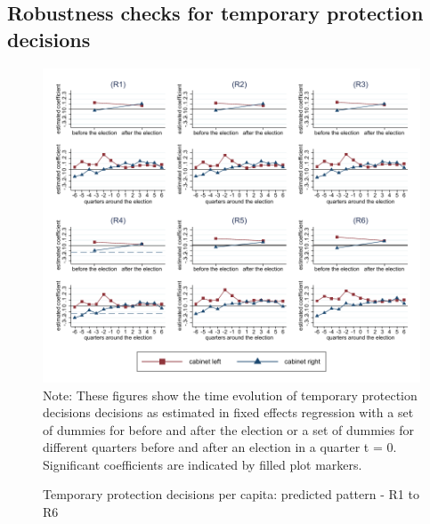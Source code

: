 \documentclass[11pt,a4paper]{scrartcl}
\begin{document}
\subsection{Robustness checks for temporary protection decisions}



\clearpage
\FloatBarrier
\begin{figure}[!ht]
	\caption{Temporary protection decisions per capita: predicted pattern - R1 to R6}
	\includegraphics[width=1\textwidth]{../results/decisions/log_temporary_protection_pc_graphs_R1-R6.pdf}
	\scriptsize{Note: These figures show the time evolution of temporary protection decisions decisions as estimated in fixed effects regression with a set of dummies for before and after the election or a set of dummies for different quarters before and after an election in a quarter t = 0. Significant coefficients are indicated by filled plot markers.}
\end{figure}

\clearpage
\FloatBarrier






\clearpage
\FloatBarrier

\end{document}
